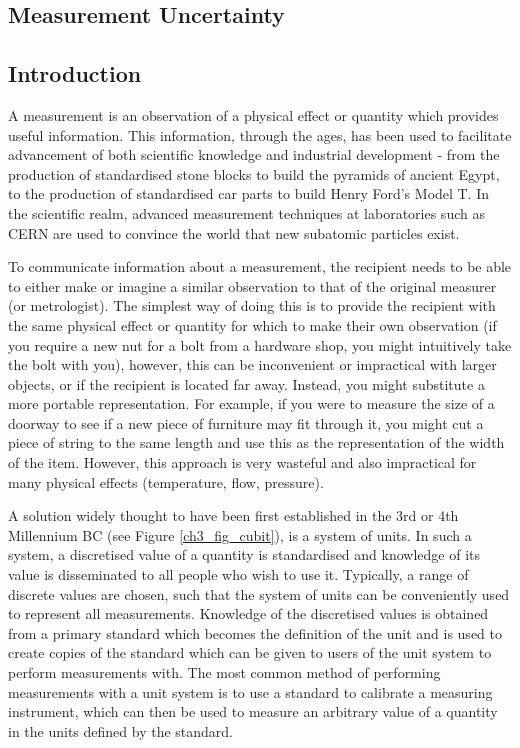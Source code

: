 \documentclass[../thesis/thesis.tex]{subfiles}
\begin{document}
	
\onlyinsubfile{\setcounter{chapter}{2}}

\begin{refsection}
\chapter{Measurement Uncertainty}
\section{Introduction}

A measurement is an observation of a physical effect or quantity which provides useful information. This information, through the ages, has been used to facilitate advancement of both scientific knowledge and industrial development - from the production of standardised stone blocks to build the pyramids of ancient Egypt, to the production of standardised car parts to build Henry Ford's Model T. In the scientific realm, advanced measurement techniques at laboratories such as CERN are used to convince the world that new subatomic particles exist.

To communicate information about a measurement, the recipient needs to be able to either make or imagine a similar observation to that of the original measurer (or metrologist). The simplest way of doing this is to provide the recipient with the same physical effect or quantity for which to make their own observation (if you require a new nut for a bolt from a hardware shop, you might intuitively take the bolt with you), however, this can be inconvenient or impractical with larger objects, or if the recipient is located far away. Instead, you might substitute a more portable representation. For example, if you were to measure the size of a doorway to see if a new piece of furniture may fit through it, you might cut a piece of string to the same length and use this as the representation of the width of the item. However, this approach is very wasteful and also impractical for many physical effects (temperature, flow, pressure).

A solution widely thought to have been first established in the 3rd or 4th Millennium BC (see Figure \ref{ch3_fig_cubit}), is a system of units. In such a system, a discretised value of a quantity is standardised and knowledge of its value is disseminated to all people who wish to use it. Typically, a range of discrete values are chosen, such that the system of units can be conveniently used to represent all measurements. Knowledge of the discretised values is obtained from a primary standard which becomes the definition of the unit and is used to create copies of the standard which can be given to users of the unit system to perform measurements with. The most common method of performing measurements with a unit system is to use a standard to calibrate a measuring instrument, which can then be used to measure an arbitrary value of a quantity in the units defined by the standard.


\end{refsection}
\end{document}

